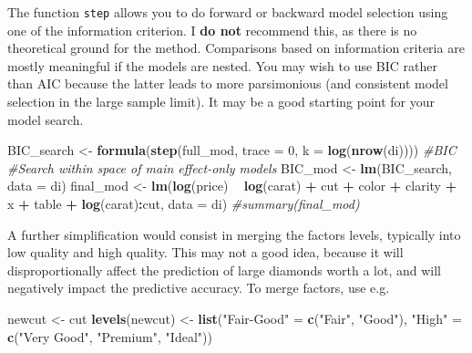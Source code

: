 \documentclass[]{book}
\newenvironment{Shaded}{\begin{snugshade}}{\end{snugshade}}
\newcommand{\CommentTok}[1]{\textcolor[rgb]{0.56,0.35,0.01}{\textit{#1}}}
\newcommand{\DataTypeTok}[1]{\textcolor[rgb]{0.13,0.29,0.53}{#1}}
\newcommand{\DecValTok}[1]{\textcolor[rgb]{0.00,0.00,0.81}{#1}}
\newcommand{\KeywordTok}[1]{\textcolor[rgb]{0.13,0.29,0.53}{\textbf{#1}}}
\newcommand{\NormalTok}[1]{#1}
\newcommand{\OperatorTok}[1]{\textcolor[rgb]{0.81,0.36,0.00}{\textbf{#1}}}
\newcommand{\StringTok}[1]{\textcolor[rgb]{0.31,0.60,0.02}{#1}}
\theoremstyle{definition}
\theoremstyle{definition}
\theoremstyle{definition}
\theoremstyle{remark}
\begin{document}
The function \texttt{step} allows you to do forward or backward model
selection using one of the information criterion. I \textbf{do not}
recommend this, as there is no theoretical ground for the method.
Comparisons based on information criteria are mostly meaningful if the
models are nested. You may wish to use BIC rather than AIC because the
latter leads to more parsimonious (and consistent model selection in the
large sample limit). It may be a good starting point for your model
search.

\begin{Shaded}
\begin{Highlighting}[]
\NormalTok{BIC_search <-}\StringTok{ }\KeywordTok{formula}\NormalTok{(}\KeywordTok{step}\NormalTok{(full_mod, }\DataTypeTok{trace =} \DecValTok{0}\NormalTok{, }\DataTypeTok{k =} \KeywordTok{log}\NormalTok{(}\KeywordTok{nrow}\NormalTok{(di)))) }\CommentTok{#BIC}
\CommentTok{#Search within space of main effect-only models}
\NormalTok{BIC_mod <-}\StringTok{ }\KeywordTok{lm}\NormalTok{(BIC_search, }\DataTypeTok{data =}\NormalTok{ di) }
\NormalTok{final_mod <-}\StringTok{ }\KeywordTok{lm}\NormalTok{(}\KeywordTok{log}\NormalTok{(price) }\OperatorTok{~}\StringTok{ }\KeywordTok{log}\NormalTok{(carat) }\OperatorTok{+}\StringTok{ }\NormalTok{cut }\OperatorTok{+}\StringTok{ }\NormalTok{color }\OperatorTok{+}\StringTok{ }\NormalTok{clarity }\OperatorTok{+}\StringTok{ }
\StringTok{                  }\NormalTok{x }\OperatorTok{+}\StringTok{ }\NormalTok{table }\OperatorTok{+}\StringTok{ }\KeywordTok{log}\NormalTok{(carat)}\OperatorTok{:}\NormalTok{cut, }\DataTypeTok{data =}\NormalTok{ di)}
\CommentTok{#summary(final_mod)}
\end{Highlighting}
\end{Shaded}

A further simplification would consist in merging the factors levels,
typically into low quality and high quality. This may not a good idea,
because it will disproportionally affect the prediction of large
diamonds worth a lot, and will negatively impact the predictive
accuracy. To merge factors, use e.g.

\begin{Shaded}
\begin{Highlighting}[]
\NormalTok{newcut <-}\StringTok{ }\NormalTok{cut}
\KeywordTok{levels}\NormalTok{(newcut) <-}\StringTok{ }\KeywordTok{list}\NormalTok{(}\StringTok{"Fair-Good"}\NormalTok{ =}\StringTok{ }\KeywordTok{c}\NormalTok{(}\StringTok{"Fair"}\NormalTok{, }\StringTok{"Good"}\NormalTok{), }\StringTok{"High"}\NormalTok{ =}\StringTok{ }\KeywordTok{c}\NormalTok{(}\StringTok{"Very Good"}\NormalTok{, }\StringTok{"Premium"}\NormalTok{, }\StringTok{"Ideal"}\NormalTok{))}
\end{Highlighting}
\end{Shaded}
\end{document}
